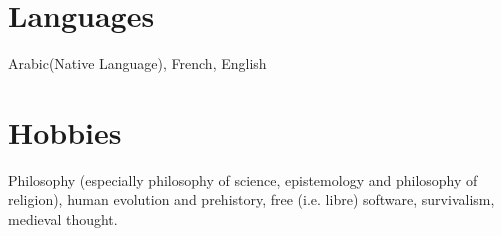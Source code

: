 \documentclass{cv}
\begin{document}



\section{Languages}
Arabic(Native Language), French, English
\section{Hobbies}

Philosophy (especially philosophy of science, epistemology and philosophy of religion), human evolution and prehistory, free (i.e. libre) software, survivalism, medieval thought.

\end{document}
